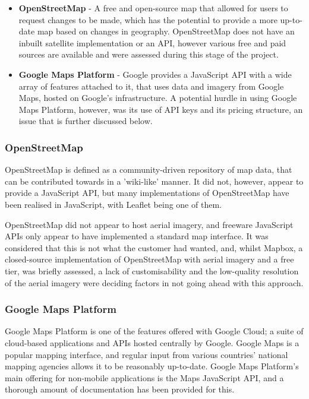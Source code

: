 \begin{itemize}
\item	\textbf{OpenStreetMap} - A free and open-source map that allowed for users to request changes to be made, which has the potential to provide a more up-to-date map based on changes in geography. OpenStreetMap does not have an inbuilt satellite implementation or an API, however various free and paid sources are available and were assessed during this stage of the project.
\item	\textbf{Google Maps Platform} - Google provides a JavaScript API with a wide array of features attached to it, that uses data and imagery from Google Maps, hosted on Google's infrastructure. A potential hurdle in using Google Maps Platform, however, was its use of API keys and its pricing structure, an issue that is further discussed below.
\end{itemize}

\subsubsection{OpenStreetMap}

OpenStreetMap is defined as a community-driven repository of map data, that can be contributed towards in a 'wiki-like' manner. It did not, however, appear to provide a JavaScript API, but many implementations of OpenStreetMap have been realised in JavaScript, with Leaflet being one of them.

OpenStreetMap did not appear to host aerial imagery, and freeware JavaScript APIs only appear to have implemented a standard map interface. It was considered that this is not what the customer had wanted, and, whilst Mapbox, a closed-source implementation of OpenStreetMap with aerial imagery and a free tier, was briefly assessed, a lack of customisability and the low-quality resolution of the aerial imagery were deciding factors in not going ahead with this approach.

\subsubsection{Google Maps Platform}

Google Maps Platform is one of the features offered with Google Cloud; a suite of cloud-based applications and APIs hosted centrally by Google. Google Maps is a popular mapping interface, and regular input from various countries' national mapping agencies allows it to be reasonably up-to-date. Google Maps Platform's main offering for non-mobile applications is the Maps JavaScript API, and a thorough amount of documentation has been provided for this.

